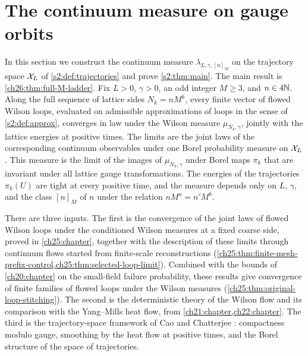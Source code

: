 \chapter{The continuum measure on gauge orbits}\label{ch26:chapter}

In this section we construct the continuum measure $\lambda_{L,\gamma,[n]_M}$ on the trajectory space $\mathcal X_L$ of \cref{s2:def:trajectories} and prove \cref{s2:thm:main}. The main result is \cref{ch26:thm:full-M-ladder}. Fix $L>0$, $\gamma>0$, an odd integer $M\ge3$, and $n\in4\mathbb N$. Along the full sequence of lattice sides $N_k=nM^k$, every finite vector of flowed Wilson loops, evaluated on admissible approximations of loops in the sense of \cref{s2:def:approx}, converges in law under the Wilson measure $\mu_{N_k,\gamma}$, jointly with the lattice energies at positive times. The limits are the joint laws of the corresponding continuum observables under one Borel probability measure on $\mathcal X_L$. This measure is the limit of the images of $\mu_{N_k,\gamma}$ under Borel maps $\pi_k$ that are invariant under all lattice gauge transformations. The energies of the trajectories $\pi_k(U)$ are tight at every positive time, and the measure depends only on $L$, $\gamma$, and the class $[n]_M$ of $n$ under the relation $nM^a=n'M^b$.

There are three inputs. The first is the convergence of the joint laws of flowed Wilson loops under the conditioned Wilson measures at a fixed coarse side, proved in \cref{ch25:chapter}, together with the description of these limits through continuum flows started from finite-scale reconstructions (\cref{ch25:thm:finite-mesh-prefix-control,ch25:thm:selected-loop-limit}). Combined with the bounds of \cref{ch20:chapter} on the small-field failure probability, these results give convergence of finite families of flowed loops under the Wilson measures (\cref{ch25:thm:original-loop-stitching}). The second is the deterministic theory of the Wilson flow and its comparison with the Yang--Mills heat flow, from \cref{ch21:chapter,ch22:chapter}. The third is the trajectory-space framework of Cao and Chatterjee \cite{CCState2023v4}: compactness modulo gauge, smoothing by the heat flow at positive times, and the Borel structure of the space of trajectories.


